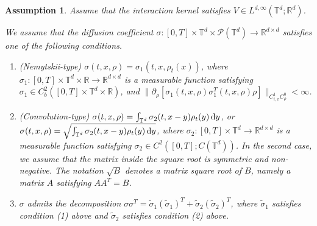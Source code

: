 \documentclass[UTF-8,reqno]{amsart}
\numberwithin{equation}{section}
\newtheorem{assumption}[theorem]{Assumption}
\theoremstyle{definition}
\def\dif{{\mathord{{\rm d}}}}
\def\dif{{\mathord{{\rm d}}}}
\begin{document}
\begin{assumption}
\label{def:ass}
Assume that the interaction kernel satisfies
$V\in L^{d,\infty}(\mathbb{T}^d;\mathbb{R}^d)$.

We assume that the diffusion coefficient
$\sigma:[0,T]\times\mathbb{T}^d\times\mathcal P(\mathbb{T}^d)
\to\mathbb{R}^{d\times d}$ satisfies one of the following conditions.

\begin{enumerate}

\item[(1)] (Nemytskii-type)
$\sigma(t,x,\rho)=\sigma_1(t,x,\rho_t(x))$,
where
$\sigma_1:[0,T]\times\mathbb{T}^d\times  \mathbb{R}\to \mathbb{R}^{d\times d}$
is a measurable function satisfying
$\sigma_1\in C_b^2([0,T]\times  \mathbb{T}^d\times \mathbb{R})$, and $\|\partial_\rho[\sigma_1(t,x,\rho)\sigma_1^T(t,x,\rho)\rho]\|_{C_{t,x}^1C_\rho^0}<\infty$.

\item[(2)] (Convolution-type)
$\sigma(t,x,\rho)=\int_{\mathbb{T}^d}\sigma_2(t,x-y)\rho_t(y)\,\dif y$, or $\sigma(t,x,\rho)=\sqrt{\int_{\mathbb{T}^d}\sigma_2(t,x-y)\rho_t(y)\,\dif y}$,
where
$\sigma_2:[0,T]\times \mathbb{T}^d\to \mathbb{R}^{d\times d}$
is a measurable function satisfying
$\sigma_2\in C^2([0,T];C( \mathbb{T}^d))$.  In the second case, we assume that the matrix inside the square root is
symmetric and non-negative. The notation $\sqrt{B}$ denotes a matrix square
root of $B$, namely a matrix $A$ satisfying $AA^T=B$.
 

\item[(3)] $\sigma$ admits the decomposition
$\sigma\sigma^T
=
\tilde{\sigma}_1(\tilde{\sigma}_1)^T
+
\tilde{\sigma}_2(\tilde{\sigma}_2)^T$,
where $\tilde{\sigma}_1$ satisfies condition \textnormal{(1)} above and $\tilde{\sigma}_2$ satisfies condition \textnormal{(2)} above.

\end{enumerate}
\end{assumption}
\end{document}
